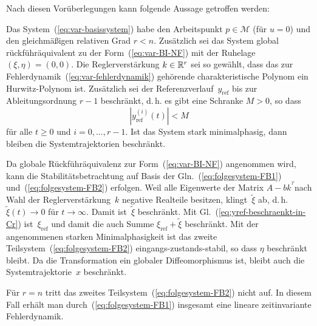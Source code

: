Nach diesen Vorüberlegungen kann folgende Aussage getroffen werden:
\begin{theorem}
\label{thm:Stabilisierung-FB}Das System~(\ref{eq:var-basissystem})
habe den Arbeitspunkt $p\in\mathcal{M}$ (für $u=0$) und den gleichmäßigen
relativen Grad $r<n$. Zusätzlich sei das System global rück\-führ\-äquivalent
zu der Form~(\ref{eq:var-BI-NF}) mit der Ruhelage $(\xi,\eta)=(0,0)$.
Die Reglerverstärkung $k\in{\mathbb{R}}^{r}$ sei so gewählt, dass das zur Fehlerdynamik~(\ref{eq:var-fehlerdynamik})
gehörende charakteristische Polynom ein Hurwitz-Polynom ist. Zusätzlich
sei der Referenzverlauf~$y_{\text{ref}}$ bis zur Ableitungsordnung
$r-1$ beschränkt, d.\,h. es gibt eine Schranke $M>0$, so dass
\begin{equation}
\left|y_{\text{ref}}^{(i)}(t)\right|<M\label{eq:yref-beschraenkt-in-Cr}
\end{equation}
für alle $t\geq0$ und $i=0,\ldots,r-1$. Ist das System stark minimalphasig,
dann bleiben die Systemtrajektorien beschränkt.
\end{theorem}
\begin{svmultproof2}
Da globale Rückführäquivalenz zur Form~(\ref{eq:var-BI-NF}) angenommen
wird, kann die Stabilitätsbetrachtung auf Basis der Gln.~(\ref{eq:folgesystem-FB1})
und~(\ref{eq:folgesystem-FB2}) erfolgen. Weil alle Eigenwerte der
Matrix $A-bk^{^{T}}$nach Wahl der Reglerverstärkung~$k$ negative
Realteile besitzen, klingt~$\tilde{\xi}$ ab, d.\,h. $\tilde{\xi}(t)\to0$
für $t\to\infty$. Damit ist~$\tilde{\xi}$ beschränkt. Mit Gl.~(\ref{eq:yref-beschraenkt-in-Cr})
ist~$\xi_{\text{ref}}$ und damit die auch Summe $\xi_{\text{ref}}+\tilde{\xi}$
beschränkt. Mit der angenommenen starken Minimalphasigkeit ist das
zweite Teilsystem~(\ref{eq:folgesystem-FB2}) eingangs-zustands-stabil,
so dass $\eta$ beschränkt bleibt. Da die Transformation ein globaler
Diffeomorphismus ist, bleibt auch die System\-trajektorie~$x$ beschränkt.
\end{svmultproof2}

Für $r=n$ tritt das zweites Teilsystem~(\ref{eq:folgesystem-FB2})
nicht auf. In diesem Fall erhält man durch~(\ref{eq:folgesystem-FB1})
insgesamt eine lineare zeitinvariante Fehlerdynamik.

\medskip{}

